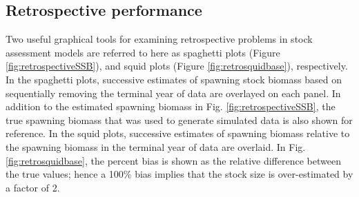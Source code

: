 


\subsection*{Retrospective performance} %
\label{sub:retrospective_performance}

Two useful graphical tools for examining retrospective problems in stock assessment models are referred to here as spaghetti plots (Figure \ref{fig:retrospectiveSSB}), and squid plots (Figure \ref{fig:retrosquidbase}), respectively.  In the spaghetti plots, successive estimates of spawning stock biomass based on sequentially removing the terminal year of data are overlayed on each panel.  In addition to the estimated spawning biomass in Fig. \ref{fig:retrospectiveSSB}, the true spawning biomass that was used to generate simulated data is also shown for reference.  In the squid plots, successive estimates of spawning biomass relative to the  spawning biomass in the terminal year of data are overlaid.  In Fig. \ref{fig:retrosquidbase}, the percent bias is shown as the relative difference between the true values; hence a 100\% bias implies that the stock size is over-estimated by a factor of 2.  



